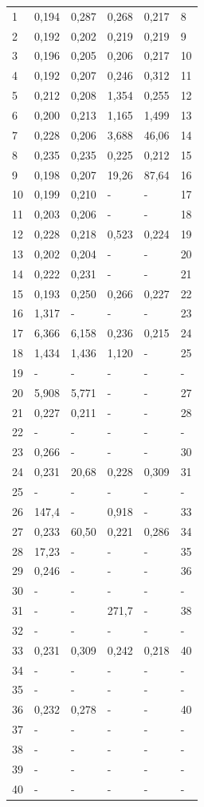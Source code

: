 \begin{center}
\begin{longtable}{|l|l|l|l|l|l|}
1 & 0,194 & 0,287 & 0,268 & 0,217 & 8 \\
2 & 0,192 & 0,202 & 0,219 & 0,219 & 9 \\
3 & 0,196 & 0,205 & 0,206 & 0,217 & 10 \\
4 & 0,192 & 0,207 & 0,246 & 0,312 & 11 \\
5 & 0,212 & 0,208 & 1,354 & 0,255 & 12 \\
6 & 0,200 & 0,213 & 1,165 & 1,499 & 13 \\
7 & 0,228 & 0,206 & 3,688 & 46,06 & 14 \\
8 & 0,235 & 0,235 & 0,225 & 0,212 & 15 \\
9 & 0,198 & 0,207 & 19,26 & 87,64 & 16 \\
10 & 0,199 & 0,210 & - & - & 17 \\
11 & 0,203 & 0,206 & - & - & 18 \\
12 & 0,228 & 0,218 & 0,523 & 0,224 & 19 \\
13 & 0,202 & 0,204 & - & - & 20 \\
14 & 0,222 & 0,231 & - & - & 21 \\
15 & 0,193 & 0,250 & 0,266 & 0,227 & 22 \\
16 & 1,317 & - & - & - & 23 \\
17 & 6,366 & 6,158 & 0,236 & 0,215 & 24 \\
18 & 1,434 & 1,436 & 1,120  & - & 25 \\
19 & - & - & - & - & - \\
20 & 5,908 & 5,771 & - & - & 27 \\
21 & 0,227 & 0,211 & - & - & 28 \\
22 & - & - & - & - & - \\
23 & 0,266 & - & - & - & 30 \\
24 & 0,231 & 20,68 & 0,228 & 0,309 & 31 \\
25 & - & - & - & - & - \\
26 & 147,4 & - & 0,918 & - & 33 \\
27 & 0,233 & 60,50 & 0,221 & 0,286 & 34 \\
28 & 17,23 & - & - & - & 35 \\
29 & 0,246 & - & - & - & 36 \\
30 & - & - & - & - & - \\
31 & - & - & 271,7 & - & 38 \\
32 & - & - & - & - & - \\
33 & 0,231 & 0,309 & 0,242 & 0,218 & 40 \\
34 & - & - & - & - & - \\
35 & - & - & - & - & - \\
36 & 0,232 & 0,278 & - & - & 40 \\
37 & - & - & - & - & - \\
38 & - & - & - & - & - \\
39 & - & - & - & - & - \\
40 & - & - & - & - & - \\
\end{longtable}
\end{center}

